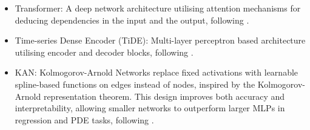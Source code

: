 \documentclass{article}
\begin{document}
\begin{itemize}
    \item Transformer: A deep network architecture utilising attention mechanisms for deducing dependencies in the input and the output, following \cite{Vaswani2017}.
    \item Time-series Dense Encoder (TiDE): Multi-layer perceptron based architecture utilising encoder and decoder blocks, following \cite{Das2023a}.
    \item KAN: Kolmogorov-Arnold Networks replace fixed activations with learnable spline-based functions on edges instead of nodes, inspired by the Kolmogorov-Arnold representation theorem. This design improves both accuracy and interpretability, allowing smaller networks to outperform larger MLPs in regression and PDE tasks, following \cite{Liu2025}.

\end{itemize}
\end{document}
